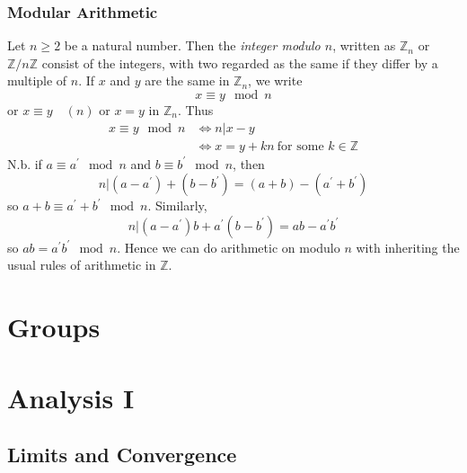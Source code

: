 \documentclass[10pt, a4paper, twoside]{report}
\begin{document}
\subsection{Modular Arithmetic}
Let \(n\geq 2\) be a natural number. Then the \emph{integer modulo \(n\)}, written as \(\mathbb{Z}_n\) or \(\mathbb{Z}/n\mathbb{Z}\) consist of the integers, with two regarded as the same if they differ by a multiple of \(n\). If \(x\) and \(y\) are the same in \(\mathbb{Z}_n\), we write 
\[x\equiv  y\mod n\]
or \(x\equiv y\quad(n)\) or \(x=y\text{  in  }\mathbb{Z}_n\). Thus 
\begin{align*}
    x\equiv y\mod n&\Leftrightarrow n|x-y \\
    &\Leftrightarrow x=y+kn\:\text{for some \(k\in\mathbb{Z}\)}
\end{align*}
N.b. if \(a\equiv a^\prime\mod n\) and \(b\equiv b^\prime\mod n\), then 
\[n|(a-a^\prime)+(b-b^\prime)=(a+b)-(a^\prime+b^\prime)\]
so \(a+b\equiv a^\prime+b^\prime\mod n\). Similarly, 
\[n|(a-a^\prime)b+a^\prime(b-b^\prime)=ab-a^\prime b^\prime\]
so \(ab=a^\prime b^\prime\mod n\). Hence we can do arithmetic on modulo \(n\) with inheriting the usual rules of arithmetic in \(\mathbb{Z}\).
\chapter{Groups}
\chapter{Analysis I}
\section{Limits and Convergence}
\end{document}
